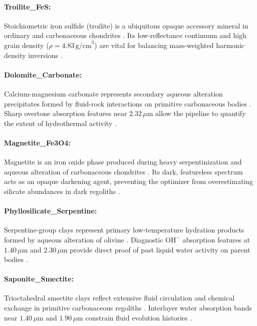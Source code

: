 \documentclass[11pt,a4paper]{article}
\begin{document}
\paragraph{Troilite\_FeS:} Stoichiometric iron sulfide (troilite) is a ubiquitous opaque accessory mineral in ordinary and carbonaceous chondrites \cite{Britt2003}. Its low-reflectance continuum and high grain density ($\rho = 4.83\,\text{g/cm}^3$) are vital for balancing mass-weighted harmonic density inversions \cite{Consolmagno2008, Britt2003}.

\paragraph{Dolomite\_Carbonate:} Calcium-magnesium carbonate represents secondary aqueous alteration precipitates formed by fluid-rock interactions on primitive carbonaceous bodies \cite{Althoff1977}. Sharp overtone absorption features near $2.32\,\mu\text{m}$ allow the pipeline to quantify the extent of hydrothermal activity \cite{Vilas1989, Rivkin2002}.

\paragraph{Magnetite\_Fe3O4:} Magnetite is an iron oxide phase produced during heavy serpentinization and aqueous alteration of carbonaceous chondrites \cite{Macke2011}. Its dark, featureless spectrum acts as an opaque darkening agent, preventing the optimizer from overestimating silicate abundances in dark regoliths \cite{Macke2011}.

\paragraph{Phyllosilicate\_Serpentine:} Serpentine-group clays represent primary low-temperature hydration products formed by aqueous alteration of olivine \cite{Deer2013, Macke2011}. Diagnostic $\text{OH}^-$ absorption features at $1.40\,\mu\text{m}$ and $2.30\,\mu\text{m}$ provide direct proof of past liquid water activity on parent bodies \cite{Vilas1989, Rivkin2002, Cloutis2011a}.

\paragraph{Saponite\_Smectite:} Trioctahedral smectite clays reflect extensive fluid circulation and chemical exchange in primitive carbonaceous regoliths \cite{Alexander2007, Macke2011}. Interlayer water absorption bands near $1.40\,\mu\text{m}$ and $1.90\,\mu\text{m}$ constrain fluid evolution histories \cite{Vilas1989, Rivkin2002}.
\end{document}

